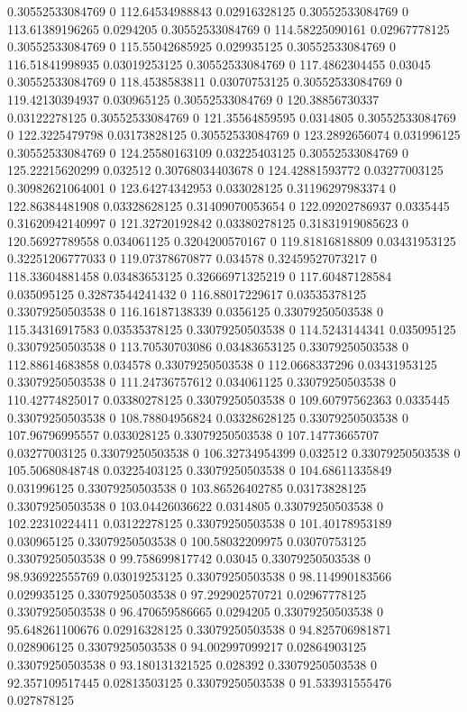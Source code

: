 0.30552533084769 0 112.64534988843 0.02916328125
0.30552533084769 0 113.61389196265 0.0294205
0.30552533084769 0 114.58225090161 0.02967778125
0.30552533084769 0 115.55042685925 0.029935125
0.30552533084769 0 116.51841998935 0.03019253125
0.30552533084769 0 117.4862304455 0.03045
0.30552533084769 0 118.4538583811 0.03070753125
0.30552533084769 0 119.42130394937 0.030965125
0.30552533084769 0 120.38856730337 0.03122278125
0.30552533084769 0 121.35564859595 0.0314805
0.30552533084769 0 122.3225479798 0.03173828125
0.30552533084769 0 123.2892656074 0.031996125
0.30552533084769 0 124.25580163109 0.03225403125
0.30552533084769 0 125.22215620299 0.032512
0.30768034403678 0 124.42881593772 0.03277003125
0.30982621064001 0 123.64274342953 0.033028125
0.31196297983374 0 122.86384481908 0.03328628125
0.31409070053654 0 122.09202786937 0.0335445
0.31620942140997 0 121.32720192842 0.03380278125
0.31831919085623 0 120.56927789558 0.034061125
0.3204200570167 0 119.81816818809 0.03431953125
0.32251206777033 0 119.07378670877 0.034578
0.32459527073217 0 118.33604881458 0.03483653125
0.32666971325219 0 117.60487128584 0.035095125
0.32873544241432 0 116.88017229617 0.03535378125
0.33079250503538 0 116.16187138339 0.0356125
0.33079250503538 0 115.34316917583 0.03535378125
0.33079250503538 0 114.5243144341 0.035095125
0.33079250503538 0 113.70530703086 0.03483653125
0.33079250503538 0 112.88614683858 0.034578
0.33079250503538 0 112.0668337296 0.03431953125
0.33079250503538 0 111.24736757612 0.034061125
0.33079250503538 0 110.42774825017 0.03380278125
0.33079250503538 0 109.60797562363 0.0335445
0.33079250503538 0 108.78804956824 0.03328628125
0.33079250503538 0 107.96796995557 0.033028125
0.33079250503538 0 107.14773665707 0.03277003125
0.33079250503538 0 106.32734954399 0.032512
0.33079250503538 0 105.50680848748 0.03225403125
0.33079250503538 0 104.68611335849 0.031996125
0.33079250503538 0 103.86526402785 0.03173828125
0.33079250503538 0 103.04426036622 0.0314805
0.33079250503538 0 102.22310224411 0.03122278125
0.33079250503538 0 101.40178953189 0.030965125
0.33079250503538 0 100.58032209975 0.03070753125
0.33079250503538 0 99.758699817742 0.03045
0.33079250503538 0 98.936922555769 0.03019253125
0.33079250503538 0 98.114990183566 0.029935125
0.33079250503538 0 97.292902570721 0.02967778125
0.33079250503538 0 96.470659586665 0.0294205
0.33079250503538 0 95.648261100676 0.02916328125
0.33079250503538 0 94.825706981871 0.028906125
0.33079250503538 0 94.002997099217 0.02864903125
0.33079250503538 0 93.180131321525 0.028392
0.33079250503538 0 92.357109517445 0.02813503125
0.33079250503538 0 91.533931555476 0.027878125
